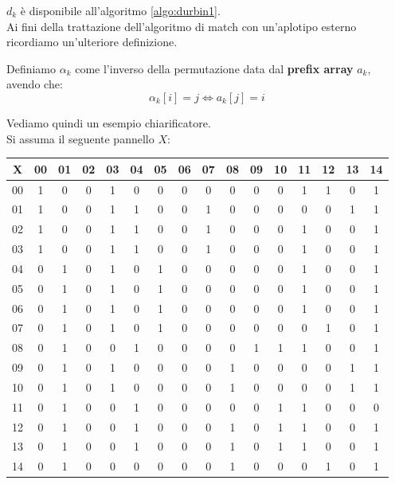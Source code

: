 $d_k$ è disponibile all'algoritmo \ref{algo:durbin1}.\\
Ai fini della trattazione dell'algoritmo di match con un'aplotipo esterno
ricordiamo un'ulteriore definizione.
\begin{definizione}
  Definiamo $\alpha_k$ come l'inverso della permutazione data dal \textbf{prefix
    array} $a_k$, avendo che:
  \[\alpha_k[i]=j \iff a_k[j]=i\]
\end{definizione}
\begin{esempio}
  \label{es:pbwt1}
  Vediamo quindi un esempio chiarificatore.\\
  Si assuma il seguente pannello $X$:
  \begin{table}[H]
    \centering
    \footnotesize
    \begin{tabular}{c|ccccccccccccccc}
      X & 00 & 01 & 02 & 03 & 04 & 05 & 06 & 07 & 08 & 09 & 10 & 11 & 12 & 13
      & 14 \\
      \hline
      00 & 1 & 0 & 0 & 1 & 0 & 0 & 0 & 0 & 0 & 0 & 0 & 1 & 1 & 0 & 1 \\
      01 & 1 & 0 & 0 & 1 & 1 & 0 & 0 & 1 & 0 & 0 & 0 & 0 & 0 & 1 & 1 \\
      02 & 1 & 0 & 0 & 1 & 1 & 0 & 0 & 1 & 0 & 0 & 0 & 1 & 0 & 0 & 1 \\
      03 & 1 & 0 & 0 & 1 & 1 & 0 & 0 & 1 & 0 & 0 & 0 & 1 & 0 & 0 & 1 \\
      04 & 0 & 1 & 0 & 1 & 0 & 1 & 0 & 0 & 0 & 0 & 0 & 1 & 0 & 0 & 1 \\
      05 & 0 & 1 & 0 & 1 & 0 & 1 & 0 & 0 & 0 & 0 & 0 & 1 & 0 & 0 & 1 \\
      06 & 0 & 1 & 0 & 1 & 0 & 1 & 0 & 0 & 0 & 0 & 0 & 1 & 0 & 0 & 1 \\
      07 & 0 & 1 & 0 & 1 & 0 & 1 & 0 & 0 & 0 & 0 & 0 & 0 & 1 & 0 & 1 \\
      08 & 0 & 1 & 0 & 0 & 1 & 0 & 0 & 0 & 0 & 1 & 1 & 1 & 0 & 0 & 1 \\
      09 & 0 & 1 & 0 & 1 & 0 & 0 & 0 & 0 & 1 & 0 & 0 & 0 & 0 & 1 & 1 \\
      10 & 0 & 1 & 0 & 1 & 0 & 0 & 0 & 0 & 1 & 0 & 0 & 0 & 0 & 1 & 1 \\
      11 & 0 & 1 & 0 & 0 & 1 & 0 & 0 & 0 & 0 & 0 & 1 & 1 & 0 & 0 & 0 \\
      12 & 0 & 1 & 0 & 0 & 1 & 0 & 0 & 0 & 1 & 0 & 1 & 1 & 0 & 0 & 1 \\
      13 & 0 & 1 & 0 & 0 & 1 & 0 & 0 & 0 & 1 & 0 & 1 & 1 & 0 & 0 & 1 \\
      14 & 0 & 1 & 0 & 0 & 0 & 0 & 0 & 0 & 1 & 0 & 0 & 0 & 1 & 0 & 1 \\

\end{tabular}
\end{table}
\end{esempio}
